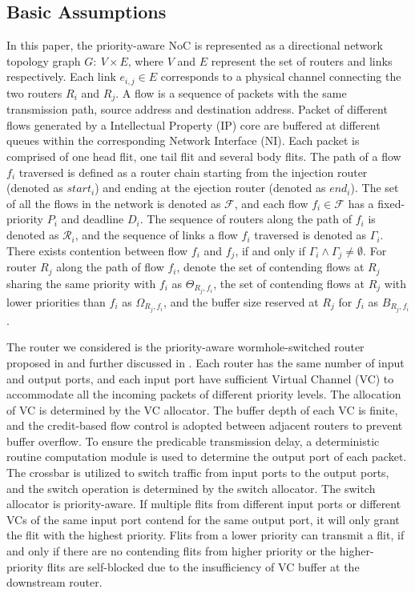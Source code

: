 \documentclass[preprint]{elsarticle}
\begin{document}
\subsection{Basic Assumptions}
In this paper, the priority-aware NoC is represented as a directional network topology graph $G:\ V\times E$, where $V$ and $E$ represent the set of routers and links respectively. Each link $e_{i,j}\in E$ corresponds to a physical channel connecting the two routers $R_i$ and $R_j$. A flow is a sequence of packets with the same transmission path, source address and destination address. Packet of different flows generated by a Intellectual Property (IP) core are buffered at different queues within the corresponding Network Interface (NI). Each packet is comprised of one head flit, one tail flit and several body flits. The path of a flow $f_i$ traversed is defined as a router chain starting from the injection router (denoted as $start_i$) and ending at the ejection router (denoted as $end_i$). The set of all the flows in the network is denoted as $\mathcal{F}$, and each flow $f_i\in\mathcal{F}$ has a fixed-priority $P_i$ and deadline $D_i$. The sequence of routers along the path of $f_i$ is denoted as $\mathcal{R}_i$, and the sequence of links a flow $f_i$ traversed is denoted as $\Gamma_i$. There exists contention between flow $f_i$ and $f_j$, if and only if $\Gamma_i\wedge\Gamma_j\neq\emptyset$. For router $R_j$ along the path of flow $f_i$, denote the set of contending flows at $R_j$ sharing the same priority with $f_i$ as $\Theta_{R_j,f_i}$, the set of contending flows at $R_j$ with lower priorities than $f_i$ as $\Omega_{R_j,f_i}$, and the buffer size reserved at $R_j$ for $f_i$ as $B_{R_j,f_i}$.

The router we considered is the priority-aware wormhole-switched router proposed in \cite{Shi:2008:RCA:1397757.1397996} and further discussed in \cite{189}\cite{73}. Each router has the same number of input and output ports, and each input port have sufficient Virtual Channel (VC) to accommodate all the incoming packets of different priority levels. The allocation of VC is determined by the VC allocator. The buffer depth of each VC is finite, and the credit-based flow control \cite{DaTo04} is adopted between adjacent routers to prevent buffer overflow. To ensure the predicable transmission delay, a deterministic routine computation module is used to determine the output port of each packet. The crossbar is utilized to switch traffic from input ports to the output ports, and the switch operation is determined by the switch allocator. The switch allocator is priority-aware. If multiple flits from different input ports or different VCs of the same input port contend for the same output port, it will only grant the flit with the highest priority. Flits from a lower priority can transmit a flit, if and only if there are no contending flits from higher priority or the higher-priority flits are self-blocked due to the insufficiency of VC buffer at the downstream router.
\end{document}
